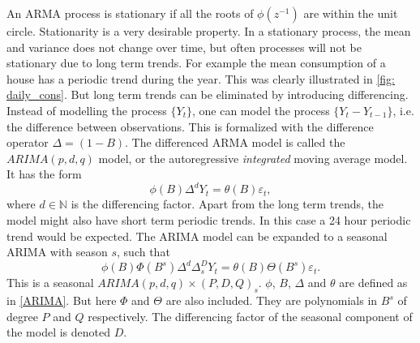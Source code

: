 \noindent An ARMA process is stationary if all the roots of $\phi(z^{-1})$ are within the unit circle. Stationarity is a very desirable property. In a stationary process, the mean and variance does not change over time, but often processes will not be stationary due to long term trends. For example the mean consumption of a house has a periodic trend during the year. This was clearly illustrated in \cref{fig: daily_cons}. But long term trends can be eliminated by introducing differencing. Instead of modelling the process $\{Y_t\}$, one can model the process $\{Y_t - Y_{t-1}\}$, i.e. the difference between observations. This is formalized with the difference operator $\Delta = (1-B)$. The differenced ARMA model is called the $ARIMA(p,d,q)$ model, or the autoregressive \textit{integrated} moving average model. It has the form
\begin{equation}
    \phi (B) \Delta^d Y_t = \theta (B) \varepsilon_t,
    \label{ARIMA}
\end{equation}
where $d\in \mathbb{N}$ is the differencing factor. Apart from the long term trends, the model might also have short term periodic trends. In this case a 24 hour periodic trend would be expected. The ARIMA model can be expanded to a seasonal ARIMA with season $s$, such that
\begin{equation}
    \phi (B) \Phi (B^s) \Delta^d \Delta_s^D Y_t = \theta (B) \Theta (B^s) \varepsilon_t.
    \label{eq:ARIMA}
\end{equation}
This is a seasonal $ARIMA(p,d,q)\times (P,D,Q)_s$. $\phi$, $B$, $\Delta$ and $\theta$ are defined as in \cref{ARIMA}. But here $\Phi$ and $\Theta$ are also included. They are polynomials in $B^s$ of degree $P$ and $Q$ respectively. The differencing factor of the seasonal component of the model is denoted $D$.

